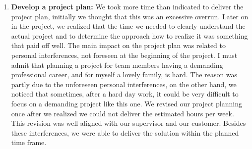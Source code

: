 \begin{enumerate}
    \item \textbf{Develop a project plan:}
        We took more time than indicated to deliver the project plan, initially we thought that this was an excessive overrun.
		Later on in the project, we realized that the time we needed to clearly understand the actual project and to determine the approach how to realize it was something that paid off well.
		The main impact on the project plan was related to personal interferences, not foreseen at the beginning of the project.
        I must admit that planning a project for team members having a demanding professional career, and for myself a lovely family, is hard.
		The reason was partly due to the unforeseen personal interferences, on the other hand, we noticed that sometimes, after a hard day work, it could be very difficult to focus on a demanding project like this one.
		We revised our project planning once after we realized we could not deliver the estimated hours per week.
		This revision was well aligned with our supervisor and our customer.
		Besides these interferences, we were able to deliver the solution within the planned time frame.
\end{enumerate}
